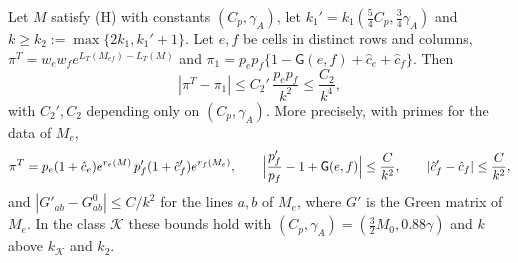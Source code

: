 
\begin{corolario}\label{cor:dos-casillas}
Let $M$ satisfy \textup{(H)} with constants $(C_p,\gamma_A)$, let $k_1'=k_1(\tfrac54C_p,\tfrac34\gamma_A)$
and $k\ge k_2:=\max\{2k_1,k_1'+1\}$. Let $e,f$ be cells in distinct rows and columns,
$\pi^T=w_ew_fe^{L_T(M_{ef})-L_T(M)}$ and $\pi_1=p_ep_f\{1-\mathsf G(e,f)+\hat c_e+\hat c_f\}$. Then
\[
 |\pi^T-\pi_1|\le C_2'\,\frac{p_ep_f}{k^2}\le\frac{C_2}{k^4},
\]
with $C_2',C_2$ depending only on $(C_p,\gamma_A)$. More precisely, with primes for the data of $M_e$,
\begin{equation}\label{eq:producto-inserciones}
 \pi^T=p_e(1+\hat c_e)e^{r_e(M)}\,p'_f(1+\hat c'_f)e^{r_f(M_e)},\qquad
 \Bigl|\frac{p'_f}{p_f}-1+\mathsf G(e,f)\Bigr|\le\frac C{k^2},\qquad
 |\hat c'_f-\hat c_f|\le\frac C{k^2},
\end{equation}
and $|G'_{ab}-G^0_{ab}|\le C/k^2$ for the lines $a,b$ of $M_e$, where $G'$ is the Green matrix of $M_e$.
In the class $\mathcal K$ these bounds hold with $(C_p,\gamma_A)=(\tfrac32M_0,0.88\gamma)$ and $k$ above
$k_{\mathcal K}$ and $k_2$.
\end{corolario}
